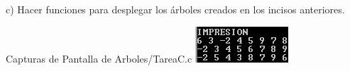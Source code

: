 c) Hacer funciones para desplegar los árboles creados
en los incisos anteriores.

Capturas de Pantalla de Arboles/TareaC.c
\newline
\includegraphics{Arboles/img/TareaC_1.png}
